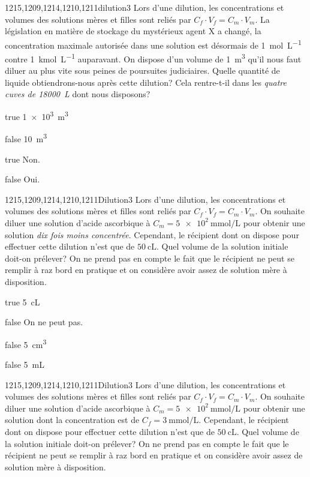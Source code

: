 			\begin{question}{1215,1209,1214,1210,1211}{dilution}{3}{}
				Lors d'une dilution, les concentrations et volumes des solutions mères et filles sont reliés par $C_f\cdot V_f = C_m\cdot V_m$. La législation en matière de stockage du mystérieux agent X a changé, la concentration maximale autorisée dans une solution est désormais de \SI{1}{\mol\per\liter} contre \SI{1}{\kilo\mol\per\liter} auparavant. On dispose d'un volume de \SI{1}{\meter\cubed} qu'il nous faut diluer au plus vite sous peines de poursuites judiciaires. Quelle quantité de liquide obtiendrons-nous après cette dilution? Cela rentre-t-il dans les \emph{quatre cuves de \SI{18000}{\liter}} dont nous disposons?
			\end{question}
			\begin{reponses} 
				\item[true] \SI{1e3}{\meter\cubed}
				\item[false] \SI{10}{\meter\cubed}
				\item[true] Non.
				\item[false] Oui.
			\end{reponses}
			\begin{question}{1215,1209,1214,1210,1211}{Dilution}{3}{}
				Lors d'une dilution, les concentrations et volumes des solutions mères et filles sont reliés par $C_f\cdot V_f = C_m\cdot V_m$. On souhaite diluer une solution d'acide ascorbique à $C_m = \SI{5e2}{\milli\mole\per\liter}$ pour obtenir une solution \emph{dix fois moins concentrée}. Cependant, le récipient dont on dispose pour effectuer cette dilution n'est que de $\SI{50}{\centi\liter}$. Quel volume de la solution initiale doit-on prélever? On ne prend pas en compte le fait que le récipient ne peut se remplir à raz bord en pratique et on considère avoir assez de solution mère à disposition.
			\end{question}
			\begin{reponses} 
				\item[true] \SI{5}{\centi\liter}
				\item[false] On ne peut pas.
				\item[false] \SI{5}{\centi\meter\cubed}
				\item[false] \SI{5}{\milli\liter}
			\end{reponses}
			\begin{question}{1215,1209,1214,1210,1211}{Dilution}{3}{}
				Lors d'une dilution, les concentrations et volumes des solutions mères et filles sont reliés par $C_f\cdot V_f = C_m\cdot V_m$. On souhaite diluer une solution d'acide ascorbique à $C_m = \SI{5e2}{\milli\mole\per\liter}$ pour obtenir une solution dont la concentration est de $C_f = \SI{3}{\milli\mole\per\liter}$. Cependant, le récipient dont on dispose pour effectuer cette dilution n'est que de $\SI{50}{\centi\liter}$. Quel volume de la solution initiale doit-on prélever? On ne prend pas en compte le fait que le récipient ne peut se remplir à raz bord en pratique et on considère avoir assez de solution mère à disposition.
			\end{question}
